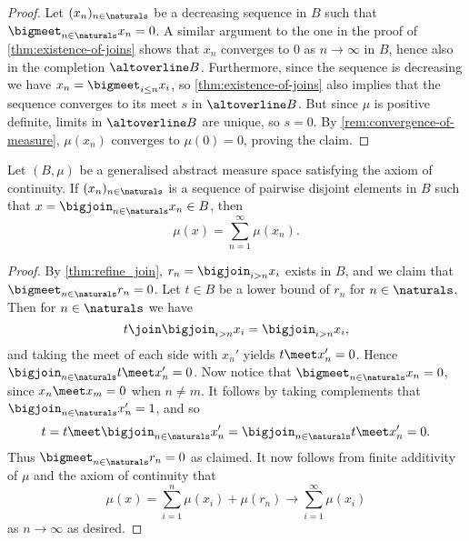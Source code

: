 \documentclass[article, a4paper, 11pt, oneside]{memoir}
\numberwithin{equation}{chapter}
\begin{document}
\begin{proof}
    Let $(x_n)_{n\in\naturals}$ be a decreasing sequence in $B$ such that $\bigmeet_{n\in\naturals} x_n = 0$. A similar argument to the one in the proof of \cref{thm:existence-of-joins} shows that $x_n$ converges to $0$ as $n \to \infty$ in $B$, hence also in the completion $\altoverline B$. Furthermore, since the sequence is decreasing we have $x_n = \bigmeet_{i \leq n} x_i$, so \cref{thm:existence-of-joins} also implies that the sequence converges to its meet $s$ in $\altoverline B$. But since $\mu$ is positive definite, limits in $\altoverline B$ are unique, so $s = 0$. By \cref{rem:convergence-of-measure}, $\mu(x_n)$ converges to $\mu(0) = 0$, proving the claim.
\end{proof}


\begin{proposition}
    \label{thm:generalised-addition}
    Let $(B, \mu)$ be a generalised abstract measure space satisfying the axiom of continuity. If $(x_n)_{n\in\naturals}$ is a sequence of pairwise disjoint elements in $B$ such that $x = \bigjoin_{n\in\naturals} x_n \in B$, then
    \begin{equation*}
        \mu(x)
            = \sum_{n=1}^\infty \mu(x_n).
    \end{equation*}
\end{proposition}

\begin{proof}
    By \cref{thm:refine_join}, $r_n = \bigjoin_{i > n} x_i$ exists in $B$, and we claim that $\bigmeet_{n\in\naturals} r_n = 0$. Let $t \in B$ be a lower bound of $r_n$ for $n \in \naturals$. Then for $n \in \naturals$ we have
    \begin{equation*}
        t \join \bigjoin_{i > n} x_i
            = \bigjoin_{i > n} x_i,
    \end{equation*}
    and taking the meet of each side with $x_n'$ yields $t \meet x_n' = 0$. Hence $\bigjoin_{n\in\naturals} t \meet x_n' = 0$. Now notice that $\bigmeet_{n\in\naturals} x_n = 0$, since $x_n \meet x_m = 0$ when $n \neq m$. It follows by taking complements that $\bigjoin_{n\in\naturals} x_n' = 1$, and so
    \begin{equation*}
        t
            = t \meet \bigjoin_{n\in\naturals} x_n'
            = \bigjoin_{n\in\naturals} t \meet x_n'
            = 0.
    \end{equation*}
    Thus $\bigmeet_{n\in\naturals} r_n = 0$ as claimed. It now follows from finite additivity of $\mu$ and the axiom of continuity that
    \begin{equation*}
        \mu(x)
            = \sum_{i=1}^n \mu(x_i) + \mu(r_n)
            \to \sum_{i=1}^\infty \mu(x_i)
    \end{equation*}
    as $n \to \infty$ as desired.
\end{proof}
\end{document}
